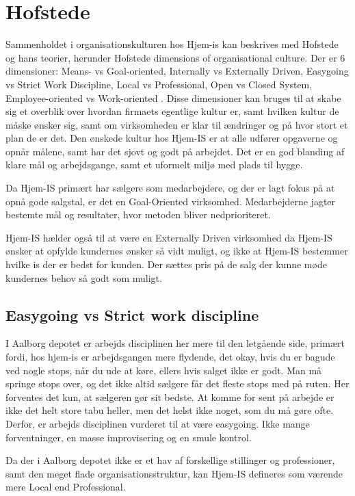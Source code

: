 \section{Hofstede}
Sammenholdet i organisationskulturen hos Hjem-is kan beskrives med Hofstede og hans teorier, herunder Hofstede dimensions of organisational culture. Der er 6 dimensioner: Means- vs Goal-oriented, Internally vs Externally Driven, Easygoing vs Strict Work Discipline, Local vs Professional, Open vs Closed System, Employee-oriented vs Work-oriented \cite{Quickbase}. Disse dimensioner kan bruges til at skabe sig et overblik over hvordan firmaets egentlige kultur er, samt hvilken kultur de måske ønsker sig, samt om virksomheden er klar til ændringer og på hvor stort et plan de er det. Den ønskede kultur hos Hjem-IS er at alle udfører opgaverne og opnår målene, samt har det sjovt og godt på arbejdet. Det er en god blanding af klare mål og arbejdsgange, samt et uformelt miljø med plads til hygge.

Da Hjem-IS primært har sælgere som medarbejdere, og der er lagt fokus på at opnå gode salgstal, er det en Goal-Oriented virksomhed. Medarbejderne jagter bestemte mål og resultater, hvor metoden bliver nedprioriteret.

Hjem-IS hælder også til at være en Externally Driven virksomhed da Hjem-IS ønsker at opfylde kundernes ønsker så vidt muligt, og ikke at Hjem-IS bestemmer hvilke is der er bedst for kunden. Der sættes pris på de salg der kunne møde kundernes behov så godt som muligt.

\subsection{Easygoing vs Strict work discipline}
I Aalborg depotet er arbejds disciplinen her mere til den letgående side, primært fordi, hos hjem-is er arbejdsgangen mere flydende, det okay, hvis du er bagude ved nogle stops, når du ude at køre, ellers hvis salget ikke er godt. Man må springe stops over, og det ikke altid sælgere får det fleste stops med på ruten. Her forventes det kun, at sælgeren gør sit bedste. At komme for sent på arbejde er ikke det helt store tabu heller, men det helst ikke noget, som du må gøre ofte. Derfor, er arbejds disciplinen vurderet til at være easygoing. Ikke mange forventninger, en masse improvisering og en smule kontrol.

Da der i Aalborg depotet ikke er et hav af forskellige stillinger og professioner, samt den meget flade organisationsstruktur, kan Hjem-IS defineres som værende mere Local end Professional.

